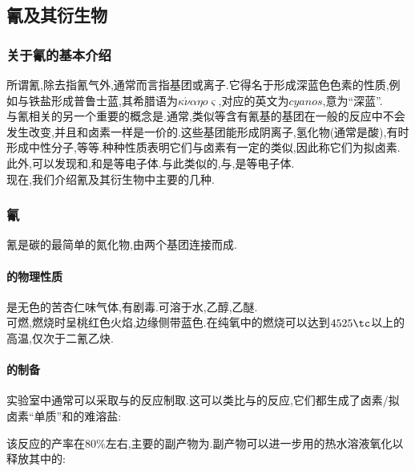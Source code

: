 \documentclass{ctexart}
\begin{document}
\subsection{氰及其衍生物}
\subsubsection{关于氰的基本介绍}
所谓氰,除去指氰气外,通常而言指基团或离子.它得名于形成深蓝色色素的性质,例如与铁盐形成普鲁士蓝,其希腊语为$\kappa\acute{\nu}\alpha\eta o\varsigma$,对应的英文为$cyanos$,意为“深蓝”.\\
\indent 与氰相关的另一个重要的概念是.通常,类似等含有氰基的基团在一般的反应中不会发生改变,并且和卤素一样是一价的.这些基团能形成阴离子,氢化物(通常是酸),有时形成中性分子,等等.种种性质表明它们与卤素有一定的类似,因此称它们为拟卤素.\\
\indent 此外,可以发现和,和是等电子体.与此类似的,与,是等电子体.\\
\indent 现在,我们介绍氰及其衍生物中主要的几种.
\subsubsection{氰}
氰是碳的最简单的氮化物,由两个基团连接而成.
\paragraph{的物理性质}
是无色的苦杏仁味气体,有剧毒.可溶于水,乙醇,乙醚.\\
\indent {}可燃,燃烧时呈桃红色火焰,边缘侧带蓝色.在纯氧中的燃烧可以达到$4525\tc$以上的高温,仅次于二氰乙炔.
\paragraph{的制备}
实验室中通常可以采取与的反应制取.这可以类比与的反应,它们都生成了卤素/拟卤素“单质”和的难溶盐:
\begin{center}
\end{center}
该反应的产率在$80\%$左右,主要的副产物为.副产物可以进一步用的热水溶液氧化以释放其中的:
\begin{center}
\end{center}
\end{document}
